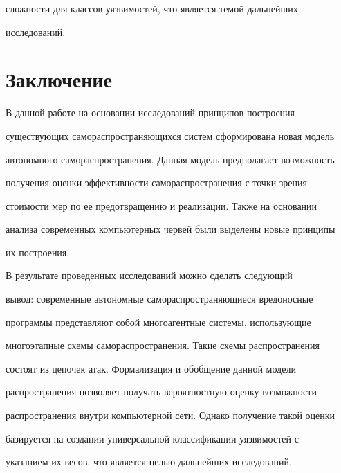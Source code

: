 сложности для классов уязвимостей, что является темой дальнейших 


исследований. 





\section{Заключение}


     


     В данной работе на основании исследований принципов построения 


существующих самораспространяющихся систем сформирована новая модель 


автономного самораспространения. Данная модель предполагает возможность 


получения оценки эффективности самораспространения с точки зрения 


стоимости мер по ее предотвращению и реализации. Также на основании 


анализа современных компьютерных червей были выделены новые принципы 


их построения. 


     


     В результате проведенных исследований можно сделать следующий 


вывод: современные автономные самораспространяющиеся вредоносные 


программы представляют собой многоагентные системы, использующие 


многоэтапные схемы самораспространения. Такие схемы распространения 


состоят из цепочек атак. Формализация и обобщение данной модели 


распространения позволяет получать вероятностную оценку возможности 


распространения внутри компьютерной сети. Однако получение такой оценки 


базируется на создании универсальной классификации уязвимостей с 


указанием их весов, что является целью дальнейших исследований. 





